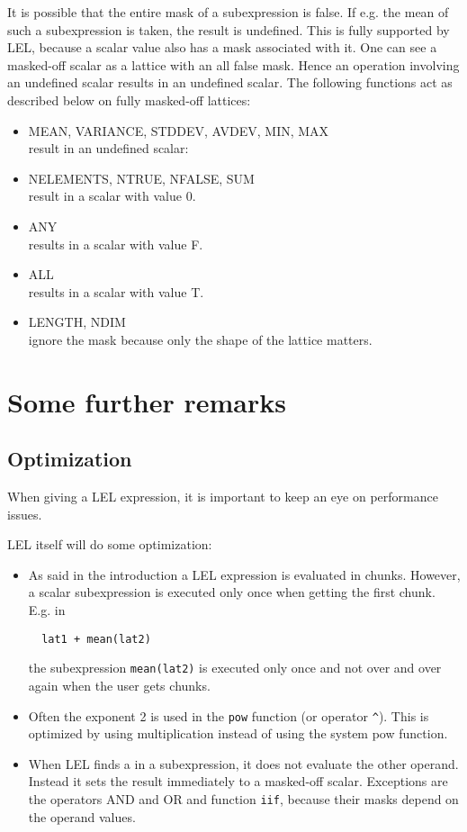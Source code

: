 It is possible that the entire mask of a subexpression is false.
If e.g. the mean of such a subexpression is taken, the result
is undefined. This is fully supported by LEL, because a scalar
value also has a mask associated with it.
One can see a masked-off scalar as a lattice with an all false mask.
Hence an operation involving an undefined scalar results in an
undefined scalar.
The following functions act as described below on fully masked-off
lattices:
\begin{itemize}
\item MEAN, VARIANCE, STDDEV, AVDEV, MIN, MAX
\\result in an undefined scalar:
\item NELEMENTS, NTRUE, NFALSE, SUM
\\result in a scalar with value 0.
\item ANY
\\results in a scalar with value F.
\item ALL
\\results in a scalar with value T.
\item LENGTH, NDIM
\\ignore the mask because only the shape of the lattice matters.
\end{itemize}


\section{Some further remarks}
\subsection{Optimization}
When giving a LEL expression, it is important to keep an eye
on performance issues.

LEL itself will do some optimization:
\begin{itemize}
\item As said in the introduction a LEL expression is evaluated
in chunks. However, a scalar subexpression is executed only once
when getting the first chunk.
E.g. in
  \begin{verbatim}
  lat1 + mean(lat2)
  \end{verbatim}
the subexpression \texttt{mean(lat2)} is executed only once
and not over and over again when the user gets chunks.

\item Often the exponent 2 is used in the \texttt{pow} function
(or operator \verb+^+). This is optimized by using multiplication
instead of using the system pow function.

\item When LEL finds a 
in a subexpression, it does not evaluate the other operand.
Instead it sets the result immediately to a masked-off scalar.
Exceptions are the operators AND and OR and function \texttt{iif},
because their masks depend on the operand values.
\end{itemize}

